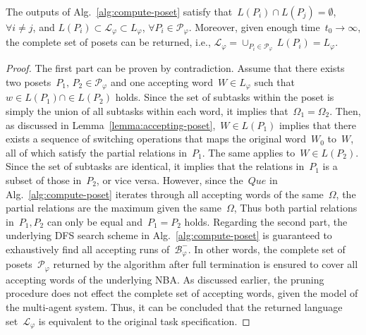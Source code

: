 \begin{lemma}\label{lemma:complete-poset}
The outputs of Alg.~\ref{alg:compute-poset}
satisfy that~$L(P_i)\cap L(P_j)=\emptyset$, $\forall i\neq j$,
and $L(P_i)\subset \mathcal{L}_\varphi \subset L_\varphi$, $\forall P_i \in \mathcal{P}_\varphi$.
Moreover, given enough time~$t_0\rightarrow \infty$,
the complete set of posets can be returned, i.e.,
$\mathcal{L}_\varphi = \cup_{P_i\in \mathcal{P}_\varphi}\,L(P_i)=L_\varphi$.
\end{lemma}
\begin{proof}
The first part can be proven by contradiction.
 Assume that there exists two posets~$P_1,\,P_2\in \mathcal{P}_\varphi$
 and one accepting word~$W\in L_\varphi$ such that~$w\in L(P_1) \cap \in L(P_2)$ holds.
Since the set of subtasks within the poset is simply
 the union of all subtasks within each word,
 it implies that~$\Omega_1 = \Omega_2$.
 Then, as discussed in Lemma~\ref{lemma:accepting-poset},~$W\in L(P_1)$ implies
 that there exists a sequence of switching operations that maps the original
 word~$W_0$ to~$W$, all of which satisfy the partial relations in~$P_1$.
 The same applies to~$W\in L(P_2)$.
 Since the set of subtasks are identical, it implies that the relations in~$P_1$
 is a subset of those in~$P_2$, or vice versa.
 However, since the~$Que$ in Alg.~\ref{alg:compute-poset} iterates through all
 accepting words of the same~$\Omega$,
 the partial relations are the maximum given the same~$\Omega$,
 Thus both partial relations in~$P_1, P_2$ can only be equal and~$P_1=P_2$ holds.
Regarding the second part,
the underlying DFS search scheme in Alg.~\ref{alg:compute-poset} is guaranteed
 to exhaustively find all accepting runs of~$\mathcal{B}^-_{\varphi}$.
 In other words, the complete set of posets~$\mathcal{P}_{\varphi}$ returned
 by the algorithm after full termination is ensured to cover all
 accepting words of the underlying NBA.
 As discussed earlier, the pruning procedure does not effect
 the complete set of accepting words, given the model of the multi-agent system.
 Thus, it can be concluded that the returned language set~$\mathcal{L}_\varphi$
 is equivalent to the original task specification.
\end{proof}

